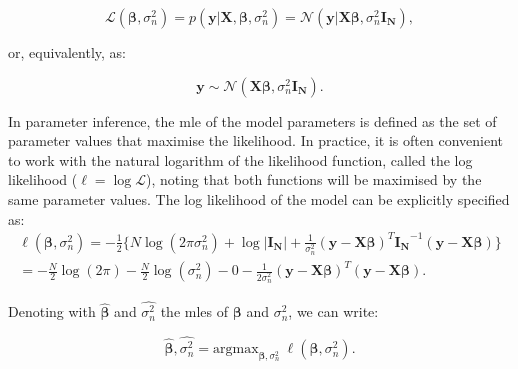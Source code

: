 \begin{equation} \label{eq:Linear_regression_likelihood}
 \mathcal{L}(\boldsymbol{\beta}, \sigma_n^2) = p(\mathbf{y}| \mathbf{X}, \boldsymbol{\beta}, \sigma_n^2) = \mathcal{N}(\mathbf{y} | \mathbf{X}\boldsymbol{\beta}, \sigma_n^2 \mathbf{I_N}),
\end{equation}

\newpage

or, 
equivalently,
as:

\begin{equation} \label{eq:Linear_regression_MVN_form}
\mathbf{y} \sim \mathcal{N}(\mathbf{X}\boldsymbol{\beta}, \sigma_n^2 \mathbf{I_N}). 
\end{equation}

In parameter inference, the \gls{mle} of the model parameters is defined as the set of parameter values that maximise the likelihood.
In practice, it is often convenient to work with the natural logarithm of the likelihood function, called the log likelihood ($\ell = \log \mathcal{L}$), noting that both functions will be maximised by the same parameter values.
The log likelihood of the model can be explicitly specified as:\\

\begin{equation} \label{eq:Linear_regression_log_likelihood}
\begin{split}
 \ell(\boldsymbol{\beta}, \sigma_n^2) = -\frac{1}{2} \bigg\{N \log (2\pi\sigma_n^2) + \log |\mathbf{I_N}|+ \frac{1}{\sigma_n^2}(\mathbf{y}-\mathbf{X}\boldsymbol{\beta})^T\mathbf{I_N}^{-1}(\mathbf{y}-\mathbf{X}\boldsymbol{\beta}) \bigg\} \\
= -\frac{N}{2} \log (2\pi) - \frac{N}{2} \log(\sigma_n^2)- 0 - \frac{1}{2\sigma_n^2}(\mathbf{y}-\mathbf{X}\boldsymbol{\beta})^T(\mathbf{y}-\mathbf{X}\boldsymbol{\beta}). 
\end{split}
\end{equation}

Denoting with $\hat{\boldsymbol{\beta}}$ and $\hat{\sigma_n^2}$ the \gls{mle}s of $\boldsymbol{\beta}$ and $\sigma_n^2$, we can write:

\begin{equation} \label{eq:Linear_regression_MLEs}
\hat{\boldsymbol{\beta}},\hat{\sigma_n^2} = \mathrm{argmax}_{\boldsymbol{\beta},\sigma_n^2} \ \ell(\boldsymbol{\beta}, \sigma_n^2). 
\end{equation} 

